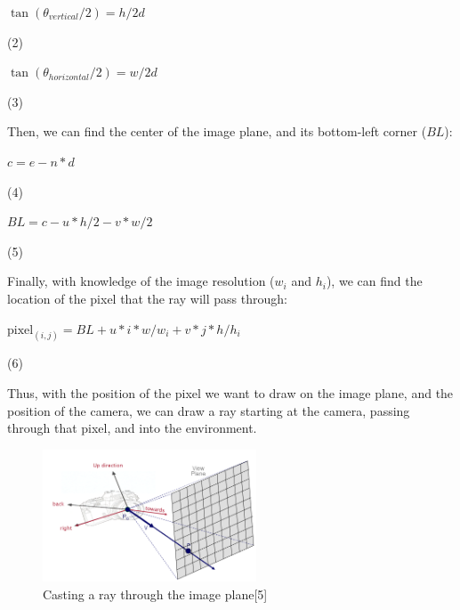 \documentclass[12pt,journal]{IEEEtran}
\begin{document}
\begin{center}
$\tan(\theta_{vertical}/2) = h / 2d$
\end{center}

\begin{flushright}
\par 
(2)
\end{flushright}

\begin{center}
$\tan(\theta_{horizontal}/2) =w / 2d$
\end{center}

\begin{flushright}
\par 
(3)
\end{flushright}

Then, we can find the center of the image plane, and its bottom-left corner ($BL$):

\begin{center}
$c = e - n * d$
\end{center}

\begin{flushright}
\par 
(4)
\end{flushright}

\begin{center}
$BL = c - u * h /2 - v *w/2$
\end{center}

\begin{flushright}
\par 
(5)
\end{flushright}

Finally, with knowledge of the image resolution ($w_{i}$ and $h_{i}$), we can find the location of the pixel that the ray will pass through:

\begin{center}
$\text{pixel}_{(i,j)}= BL + u * i * w / w_{i} + v * j * h/h_{i}$
\end{center}

\begin{flushright}
\par 
(6)
\end{flushright}

Thus, with the position of the pixel we want to draw on the image plane, and the position of the camera, we can draw a ray starting at the camera, passing through that pixel, and into the environment.

\begin{figure}[!t]

\centering
\includegraphics[width=2.5in]{raycast_viewplane}
\caption{Casting a ray through the image plane[5]}
\label{raycast_imageplane}

\end{figure}
\end{document}
